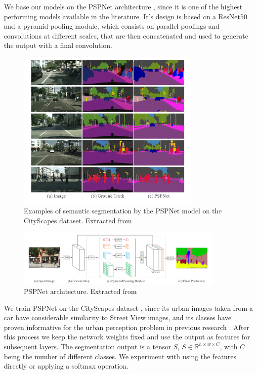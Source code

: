 We base our models on the PSPNet architecture \cite{pspnet}, since it is one of the highest performing models
available in the literature. It's design is based on a ResNet50 and a pyramid pooling module, which consists on
parallel poolings and convolutions at different scales, that are then concatenated and used to generate the output with a
final convolution.

\begin{figure}[ht]
	\begin{center}
	\includegraphics[width=0.8\textwidth]{./figures/segmentation.png}
	\caption[Example of Semantic Segmentation]{Examples of semantic segmentation by the PSPNet model on the CityScapes dataset. Extracted from  }
	\label{fig:segmentation}
	\end{center}
\end{figure}

\begin{figure}[ht]
	\begin{center}
	\includegraphics[width=0.9\textwidth]{./figures/pspnet.png}
	\caption[PSPNet architecture]{PSPNet architecture. Extracted from  }
	\label{fig:segmentation}
	\end{center}
\end{figure}

We train PSPNet on the CityScapes dataset \cite{cordts_cityscapes}, since its urban images taken from a car have
considerable similarity to Street View images, and its classes have proven informative for the urban perception problem
in previous research \cite{rossetti,zhang_measuring}. After this process we keep the network weights fixed
and use the output as features for subsequent layers. The segmentation output  is a tensor $S$, $S \in \mathbb{R}^{h\times w \times C}$, with $C$
being the number of different classes. We experiment with using the features directly or applying a softmax operation.

